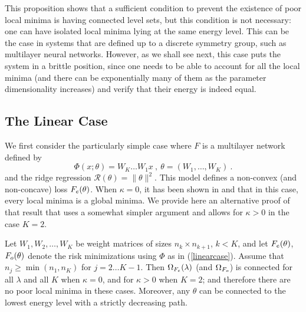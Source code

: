 This proposition shows that a sufficient condition to prevent the existence of poor local minima is having connected level sets, but this condition is not necessary: one can have isolated local minima lying 
at the same energy level. This can be the case in systems that are defined up to 
a discrete symmetry group, such as multilayer neural networks. However, as we shall see next, this case puts the system in a brittle position, since one needs to be able to account for all the local minima (and there can be exponentially many of them as the parameter dimensionality increases) and verify that their energy is indeed equal. 

\subsection{The Linear Case}

We first consider the 
particularly simple case where 
$F$ is a multilayer network defined by
\begin{equation}
\label{linearcase}
\Phi(x;\theta) = W_K \dots W_1 x~,~\theta = (W_1, \dots, W_K)~.
\end{equation}
and the ridge regression $\mathcal{R}(\theta) =\| \theta \|^2$. This model defines a non-convex (and non-concave) loss $F_{e}(\theta)$.
When $\kappa = 0$, it has been shown in \cite{saxe2013exact} and \cite{kawaguchi2016deep} that in this case, 
every local minima is a global minima.  
We provide here an alternative proof of that result that uses
a somewhat simpler argument and allows for $\kappa > 0$ in the case $K=2$.


\begin{proposition}
\label{proplinear}
Let $W_1, W_2, \dots, W_K$ be weight matrices of sizes 
$n_k \times n_{k+1}$, $k < K$, and let $F_{e}(\theta)$, $F_{o}(\theta)$ 
denote the risk minimizations using $\Phi$ as in (\ref{linearcase}). %
Assume that $n_j \geq \min(n_1, n_K)$ for $j=2 \dots K-1$.
Then $\Omega_{F_{e}}(\lambda)$ (and $\Omega_{F_{o}}$) is connected for all $\lambda$ and all $K$ when $\kappa=0$, and for $\kappa>0$ when $K=2$; and therefore there are no poor local minima in these cases. 
Moreover, any $\theta$ can be connected to the lowest energy level with a strictly decreasing path. %
\end{proposition}


